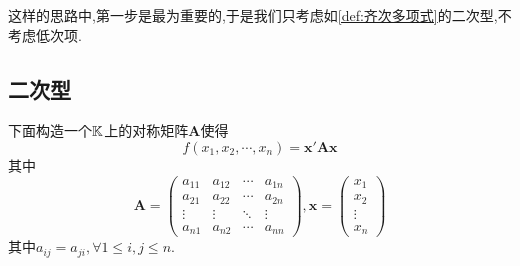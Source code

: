 这样的思路中,第一步是最为重要的,于是我们只考虑如\cref{def:齐次多项式}的二次型,不考虑低次项.
\subsection{二次型}
下面构造一个$\mathbb{K} $上的对称矩阵$\bm{A}$使得\[
    f\left(
    x_1,x_2,\cdots,x_n
    \right)=\bm{x}'\bm{Ax}
\]其中\[
    \bm{A}=\begin{pmatrix}
        a_{11} & a_{12} & \cdots & a_{1n} \\
        a_{21} & a_{22} & \cdots & a_{2n} \\
        \vdots & \vdots & \ddots & \vdots \\
        a_{n1} & a_{n2} & \cdots & a_{nn}
    \end{pmatrix},\bm{x}=\begin{pmatrix}
        x_1 \\x_2\\\vdots\\x_n
    \end{pmatrix}
\]其中$a_{ij}=a_{ji},\forall 1\leqslant i,j\leqslant n$.

